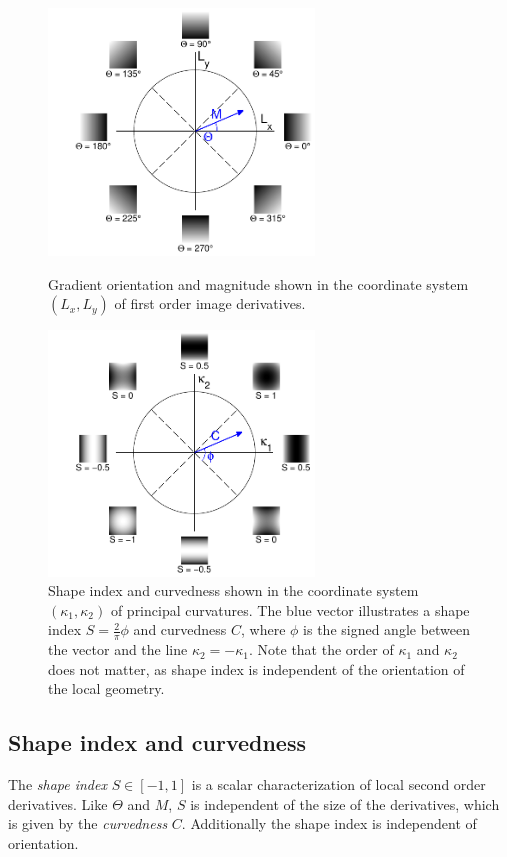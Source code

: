 \documentclass[thesis.tex]{subfiles}
\begin{document}
\begin{figure}[p]
	\centering
	\includegraphics[width=0.63\textwidth,clip=true,trim=31 0 0 0]{img/gradientOrientationTheory.pdf}
	\caption{Gradient orientation and magnitude shown in the coordinate system $(L_x,L_y)$ of first order image derivatives.}
	\label{fig:gradientOrientationTheory}
	\vspace{0.5cm}	
	\includegraphics[width=0.63\textwidth,clip=true,trim=31 0 0 0]{img/shapeIndexTheory.pdf}
	\caption{Shape index and curvedness shown in the coordinate system $(\kappa_1,\kappa_2)$ of principal curvatures. The blue vector illustrates a shape index $S = \frac{2}{\pi} \phi$ and curvedness $C$, where $\phi$ is the signed angle between the vector and the line $\kappa_2 = -\kappa_1$. Note that the order of $\kappa_1$ and $\kappa_2$ does not matter, as shape index is independent of the orientation of the local geometry.}
	\label{fig:shapeIndexTheory}
\end{figure}

\subsection{Shape index and curvedness}
\label{sec:shapeIndexTheory}
%
The \emph{shape index} $S \in [-1,1]$ \cite{koenderink1992surface} is a scalar characterization of local second order derivatives. Like $\Theta$ and $M$, $S$ is independent of the size of the derivatives, which is given by the \emph{curvedness} $C$. Additionally the shape index is independent of orientation.
\end{document}
